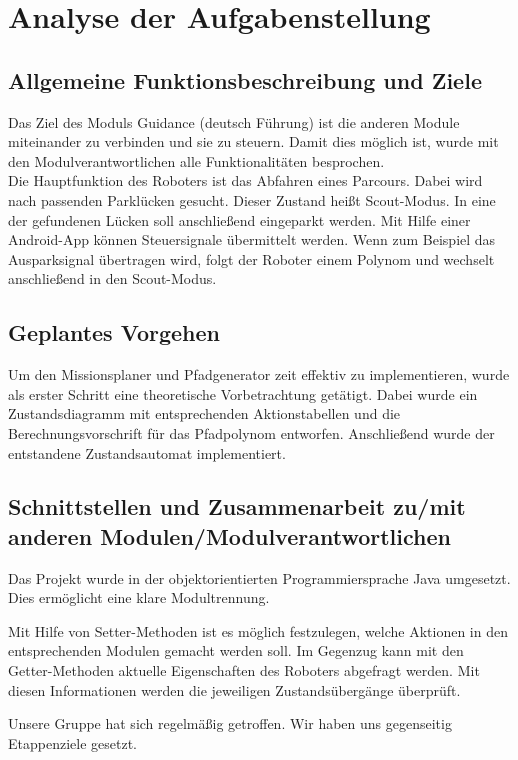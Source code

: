 \chapter{Analyse der Aufgabenstellung}


\section{Allgemeine Funktionsbeschreibung und Ziele}
Das Ziel des Moduls Guidance (deutsch Führung) ist die anderen Module miteinander zu verbinden und sie zu steuern. 
Damit dies möglich ist, wurde mit den Modulverantwortlichen alle Funktionalitäten besprochen. \\

\noindent Die Hauptfunktion des Roboters ist das Abfahren eines Parcours. Dabei wird nach passenden Parklücken gesucht. Dieser Zustand heißt Scout-Modus.
In eine der gefundenen Lücken soll anschließend eingeparkt werden. Mit Hilfe einer Android-App können Steuersignale übermittelt werden. Wenn zum Beispiel das Ausparksignal übertragen wird, folgt der Roboter einem Polynom und wechselt anschließend in den Scout-Modus.

\section{Geplantes Vorgehen}

Um den Missionsplaner und Pfadgenerator zeit effektiv zu implementieren, wurde als erster Schritt eine theoretische Vorbetrachtung getätigt. Dabei wurde ein Zustandsdiagramm mit entsprechenden Aktionstabellen und die Berechnungsvorschrift für das Pfadpolynom entworfen. Anschließend wurde der entstandene Zustandsautomat implementiert.

\section{Schnittstellen und Zusammenarbeit zu/mit anderen Modulen/Modulverantwortlichen}

Das Projekt wurde in der objektorientierten Programmiersprache Java umgesetzt. Dies ermöglicht eine klare Modultrennung.


Mit Hilfe von Setter-Methoden ist es möglich festzulegen, welche Aktionen in den entsprechenden Modulen gemacht werden soll.
Im Gegenzug kann mit den Getter-Methoden aktuelle Eigenschaften des Roboters abgefragt werden. Mit diesen Informationen werden die jeweiligen Zustandsübergänge überprüft.


Unsere Gruppe hat sich regelmäßig getroffen. Wir haben uns gegenseitig Etappenziele gesetzt.